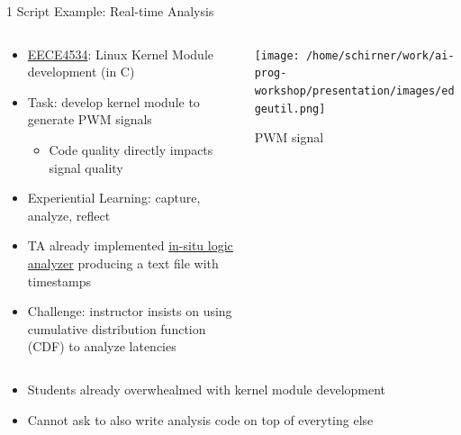 \documentclass[xcolor=dvipsnames, aspectratio=169]{beamer}
\begin{document}
\begin{frame}{1 Script Example: Real-time Analysis}
  \begin{columns}[T]
    \begin{column}{0.6\textwidth}
      \begin{itemize}
        \item \href{https://neu-ece-4534.github.io}{EECE4534}: Linux Kernel Module development (in C)
        \item Task: develop kernel module to generate PWM signals
        \begin{itemize}
          \item Code quality directly impacts signal quality
        \end{itemize}
        \item Experiential Learning: capture,  analyze, reflect
        \item TA already implemented \href{https://neu-ece-4534.github.io/pulsecap.html}{in-situ logic analyzer} producing a text file with timestamps
        \item Challenge: instructor insists on using cumulative distribution function (CDF) to analyze latencies  
      \end{itemize}
    \end{column}
    
    \begin{column}{0.35\textwidth}
      \texttt{[image: /home/schirner/work/ai-prog-workshop/presentation/images/edgeutil.png]}
      \tiny\centerline{PWM signal}
    \end{column}
  \end{columns}

  \begin{alertbox}
    \begin{itemize}
      \item Students already overwhealmed with kernel module development
      \item Cannot ask to also write analysis code on top of everyting else
    \end{itemize}
  \end{alertbox}
\end{frame}
\end{document}
